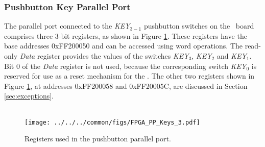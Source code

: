 \subsubsection{Pushbutton Key Parallel Port}

The parallel port connected to the {\it KEY}$_{3-1}$ 
pushbutton switches on the \DEBoard~board comprises three 3-bit
registers, as shown in Figure \ref{fig:pushbutton_port}. These registers have 
the base addresses {\sf 0xFF200050} and can be accessed using word operations. 
The read-only {\it Data} register provides the 
values of the switches {\it KEY}$_3$, {\it KEY}$_2$ and {\it KEY}$_1$. Bit 0 of the 
{\it Data} register is not used, because the corresponding switch {\it KEY}$_0$ is reserved for
use as a reset mechanism for the \systemName.
The other two registers shown in Figure \ref{fig:pushbutton_port}, at addresses
{\sf 0xFF200058} and {\sf 0xFF20005C}, are discussed in Section \ref{sec:exceptions}.
~\\
~\\
\begin{figure}[h!]
   \begin{center}
       \texttt{[image: ../../../common/figs/FPGA\_PP\_Keys\_3.pdf]}
   \end{center}
   \caption{Registers used in the pushbutton parallel port.}
	\label{fig:pushbutton_port}
\end{figure}
